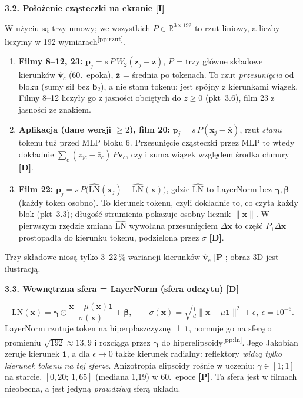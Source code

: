 \documentclass[a4paper,11pt]{article}
\newcommand{\stD}{\textcolor{dok}{\textsf{\textbf{[D]}}}}
\newcommand{\stP}{\textcolor{pom}{\textsf{\textbf{[P]}}}}
\newcommand{\stI}{\textcolor{ilu}{\textsf{\textbf{[I]}}}}
\newcommand{\LN}{\mathrm{LN}}
\newcommand{\pp}[1]{\textsuperscript{\ref{pp:#1}}}
\newcommand{\elem}[1]{\par\medskip\noindent\textbf{#1}\par\nopagebreak}
\begin{document}
\elem{3.2. Położenie cząsteczki na ekranie \stI}
W użyciu są trzy umowy; we wszystkich $P\in\mathbb R^{3\times192}$ to rzut liniowy, a liczby liczymy w 192 wymiarach\pp{rzut}.
\begin{enumerate}
\item \textbf{Filmy 8--12, 23:} $\bm p_j = s\,P\,W_2(\bm z_j-\bar{\bm z})$, $P$ = trzy główne składowe kierunków $\hat{\bm v}_c$ (60.~epoka),
$\bar{\bm z}$ = średnia po tokenach. To rzut \emph{przesunięcia} od bloku (sumy sił bez $\bm b_2$), a nie stanu tokenu; jest spójny
z kierunkami wiązek. Filmy 8--12 liczyły go z jasności obciętych do $z\ge0$ (pkt~3.6), film 23 z jasności ze znakiem.
\item \textbf{Aplikacja (dane wersji $\ge2$), film 20:} $\bm p_j = s\,P(\bm x_j-\bar{\bm x})$, rzut \emph{stanu} tokenu tuż przed MLP bloku 6.
Przesunięcie cząsteczki przez MLP to wtedy dokładnie $\sum_c (z_{jc}-\bar z_c)\,P\bm v_c$, czyli suma wiązek względem środka chmury \stD.
\item \textbf{Film 22:} $\bm p_j = s\,P\big(\widehat{\LN}(\bm x_j)-\overline{\widehat{\LN}(\bm x)}\big)$, gdzie $\widehat{\LN}$ to LayerNorm bez
$\bm\gamma,\bm\beta$ (każdy token osobno). To kierunek tokenu, czyli dokładnie to, co czyta każdy blok (pkt~3.3); długość strumienia
pokazuje osobny licznik $\lVert\bm x\rVert$. W pierwszym rzędzie zmiana $\widehat{\LN}$ wywołana przesunięciem $\Delta\bm x$ to część
$P_1\Delta\bm x$ prostopadła do kierunku tokenu, podzielona przez $\sigma$ \stD.
\end{enumerate}
Trzy składowe niosą tylko 3--22\,\% wariancji kierunków $\hat{\bm v}_c$ \stP; obraz 3D jest ilustracją.

\elem{3.3. Wewnętrzna sfera = LayerNorm (sfera odczytu) \stD}
\begin{equation}
\LN(\bm x)=\bm\gamma\odot\frac{\bm x-\mu(\bm x)\bm 1}{\sigma(\bm x)}+\bm\beta,\qquad
\sigma(\bm x)=\sqrt{\tfrac1d\lVert\bm x-\mu\bm 1\rVert^2+\epsilon},\ \epsilon=10^{-6}.
\end{equation}
LayerNorm rzutuje token na hiperpłaszczyznę $\perp\bm 1$, normuje go na sferę o promieniu $\sqrt{192}\approx13{,}9$ i rozciąga przez
$\bm\gamma$ do hiperelipsoidy\pp{ln}. Jego Jakobian zeruje kierunek $\bm 1$, a dla $\epsilon\to0$ także kierunek radialny: reflektory
\emph{widzą tylko kierunek tokenu na tej sferze}. Anizotropia elipsoidy rośnie w uczeniu: $\gamma\in[1;1]$ na starcie,
$[0{,}20;\,1{,}65]$ (mediana 1,19) w 60.~epoce \stP. Ta sfera jest w filmach nieobecna, a jest jedyną \emph{prawdziwą} sferą układu.
\end{document}

